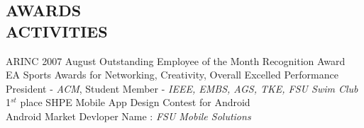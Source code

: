 \documentclass[margin]{res}
\begin{document}
\begin{resume}
\section{AWARDS \\ ACTIVITIES}
ARINC 2007 August Outstanding Employee of the Month Recognition Award \\
EA Sports Awards for Networking, Creativity, Overall Excelled Performance\\
President - {\it ACM}, Student Member - {\it IEEE, EMBS, AGS, TKE, FSU Swim Club}\\
1$^{st}$ place SHPE Mobile App Design Contest for Android\\
Android Market Devloper Name : \textit{FSU Mobile Solutions}



\end{resume}
\end{document}
